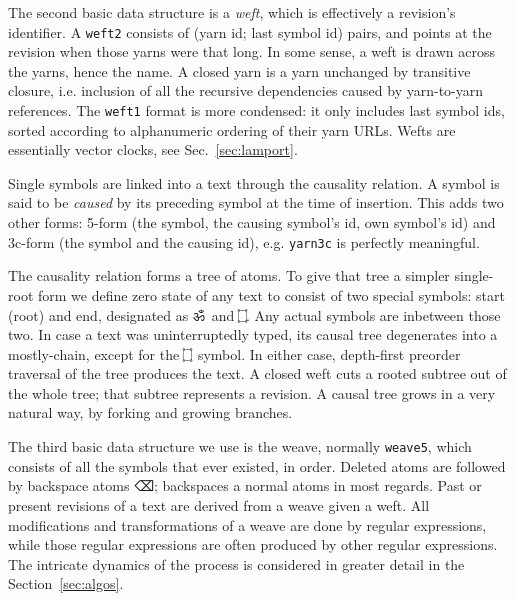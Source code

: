 \documentclass{acm_proc_article-sp}
\begin{document}
The second basic data structure is a \emph{weft}, which
is effectively a revision's identifier. A {\tt weft2} consists
of (yarn id; last symbol id) pairs, and points at the
revision when those yarns were that long. 
In some sense, a weft is drawn across the yarns,
hence the name. A closed yarn is
a yarn unchanged by transitive closure, i.e. inclusion of
all the recursive dependencies caused by yarn-to-yarn
references. The {\tt weft1} format is more condensed:
it only includes last symbol ids, sorted
according to alphanumeric ordering of their yarn URLs.
Wefts are essentially vector clocks,
see Sec.~\ref{sec:lamport}.

Single symbols are linked into a text through the causality
relation. A symbol is said to be \emph{caused} by its preceding
symbol at the time of
insertion. This adds two other forms: 5-form (the symbol, the causing
symbol's id, own symbol's id) and 3c-form (the symbol and the causing
id), e.g. {\tt yarn3c} is perfectly meaningful. 

\newcommand{\aum}{{\fontspec{Devanagari MT}\selectfont ॐ}}
\newcommand{\eoa}{{\fontspec{Geeza Pro}\selectfont ۝}}
\newcommand{\bsp}{{\fontspec{Apple Symbols} ⌫}}
\newcommand{\zero}{{\fontspec{Apple Symbols} ⌀}}
The causality relation forms a tree of atoms.
To give that tree a simpler single-root form we define zero
state of any text to consist of two special symbols: start (root)
and end, designated as \aum ~and \eoa. Any actual symbols are
inbetween those two.
In case a text was uninterruptedly typed, its causal tree
degenerates into a mostly-chain, except for the \eoa ~symbol.
In either case, depth-first preorder traversal of the tree
produces the text. A closed weft cuts a rooted subtree out
of the whole tree; that subtree represents a revision.
A causal tree grows in a very natural way, by forking and
growing branches.

The third basic data structure we use is the weave, 
normally {\tt weave5},
which consists of all the symbols that ever existed, in order. 
Deleted atoms are followed by backspace atoms \bsp; backspaces
a normal atoms in most regards.
Past or present revisions of a text are derived from a weave given
a weft.
All modifications and transformations of a weave are done by
regular expressions, while those regular expressions are often
produced by other regular expressions. The intricate dynamics of
the process is considered in greater detail in the 
Section~\ref{sec:algos}.
\end{document}

